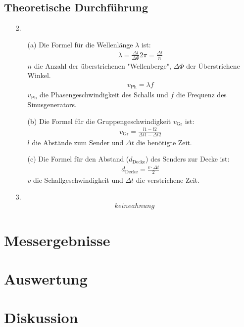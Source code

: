 \documentclass[12pt]{scrartcl}
\begin{document}
\subsection{Theoretische Durchführung}
\begin{enumerate}
\item[2.]
\begin{enumerate}
\item[(a)]
Die Formel für die Wellenlänge $\lambda$ ist:
\begin{align}
\lambda = \frac{\Delta l}{\Delta \Phi} 2\pi
= \frac{\Delta l}{n}
\end{align}
$n$ die Anzahl der überstrichenen "Wellenberge", $\Delta \Phi$ der Überstrichene Winkel.
\begin{align}
v_{\text{Ph}} = \lambda f
\end{align}
$v_{\text{Ph}}$ die Phasengeschwindigkeit des Schalls und $f$ die Frequenz des Sinusgenerators.
\item[(b)]
Die Formel für die Gruppengeschwindigkeit $v_{\text{Gr}}$ ist:
\begin{align}
v_{\text{Gr}} = \frac{l1-l2}{\Delta t1 - \Delta t2}
\end{align}
$l$ die Abstände zum Sender und $\Delta t$ die benötigte Zeit.
\item[(c)]
Die Formel für den Abstand ($d_{\text{Decke}}$) des Senders zur Decke ist:
\begin{align}
d_{\text{Decke}} = \frac{v \cdot \Delta t}{2}
\end{align}
$v$ die Schallgeschwindigkeit und $\Delta t$ die verstrichene Zeit.
\end{enumerate}

\item[3.]
\begin{align}
keineahnung
\end{align}

\end{enumerate}

\section{Messergebnisse}



\section{Auswertung}


\section{Diskussion}


\end{document}
